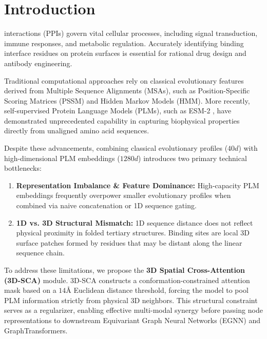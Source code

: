 \documentclass[10pt,journal,compsoc]{IEEEtran}
\begin{document}
\maketitle
\IEEEdisplaynontitleabstractindextext
\IEEEpeerreviewmaketitle

\section{Introduction}
 interactions (PPIs) govern vital cellular processes, including signal transduction, immune responses, and metabolic regulation. Accurately identifying binding interface residues on protein surfaces is essential for rational drug design and antibody engineering.

Traditional computational approaches rely on classical evolutionary features derived from Multiple Sequence Alignments (MSAs), such as Position-Specific Scoring Matrices (PSSM) and Hidden Markov Models (HMM). More recently, self-supervised Protein Language Models (PLMs), such as ESM-2 \cite{esm2}, have demonstrated unprecedented capability in capturing biophysical properties directly from unaligned amino acid sequences.

Despite these advancements, combining classical evolutionary profiles ($40d$) with high-dimensional PLM embeddings ($1280d$) introduces two primary technical bottlenecks:
\begin{enumerate}
    \item \textbf{Representation Imbalance \& Feature Dominance:} High-capacity PLM embeddings frequently overpower smaller evolutionary profiles when combined via naive concatenation or 1D sequence gating.
    \item \textbf{1D vs. 3D Structural Mismatch:} 1D sequence distance does not reflect physical proximity in folded tertiary structures. Binding sites are local 3D surface patches formed by residues that may be distant along the linear sequence chain.
\end{enumerate}

To address these limitations, we propose the \textbf{3D Spatial Cross-Attention (3D-SCA)} module. 3D-SCA constructs a conformation-constrained attention mask based on a $14\text{Å}$ Euclidean distance threshold, forcing the model to pool PLM information strictly from physical 3D neighbors. This structural constraint serves as a regularizer, enabling effective multi-modal synergy before passing node representations to downstream Equivariant Graph Neural Networks (EGNN) and GraphTransformers.
\end{document}
